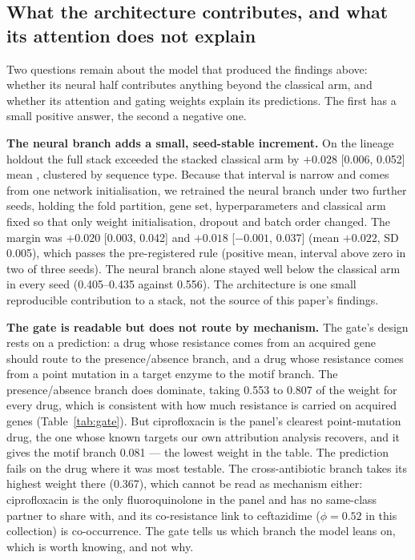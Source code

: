 \subsection*{What the architecture contributes, and what its attention does not explain}

Two questions remain about the model that produced the findings above: whether its neural half
contributes anything beyond the classical arm, and whether its attention and gating weights explain
its predictions. The first has a small positive answer, the second a negative one.

\textbf{The neural branch adds a small, seed-stable increment.} On the lineage holdout the full
stack exceeded the stacked classical arm by $+0.028$ [0.006, 0.052] mean \nap{}, clustered by
sequence type. Because that interval is narrow and comes from one network initialisation, we
retrained the neural branch under two further seeds, holding the fold partition, gene set,
hyperparameters and classical arm fixed so that only weight initialisation, dropout and batch order
changed. The margin was $+0.020$ [0.003, 0.042] and $+0.018$ [$-0.001$, 0.037] (mean $+0.022$, SD
0.005), which passes the pre-registered rule (positive mean, interval above zero in two of three
seeds). The neural branch alone stayed well below the classical arm in every seed (0.405--0.435
against 0.556). The architecture is one small reproducible contribution to a stack, not the source
of this paper's findings.

\textbf{The gate is readable but does not route by mechanism.} The gate's design rests on a
prediction: a drug whose resistance comes from an acquired gene should route to the
presence/absence branch, and a drug whose resistance comes from a point mutation in a target enzyme
to the motif branch. The presence/absence branch does dominate, taking 0.553 to 0.807 of the weight
for every drug, which is consistent with how much \Ecoli{} resistance is carried on acquired genes
(Table~\ref{tab:gate}). But ciprofloxacin is the panel's clearest point-mutation drug, the one
whose known targets our own attribution analysis recovers, and it gives the motif branch 0.081 ---
the lowest weight in the table. The prediction fails on the drug where it was most testable. The
cross-antibiotic branch takes its highest weight there (0.367), which cannot be read as mechanism
either: ciprofloxacin is the only fluoroquinolone in the panel and has no same-class partner to
share with, and its co-resistance link to ceftazidime ($\phi = 0.52$ in this collection) is
co-occurrence. The gate tells us which branch the model leans on, which is worth knowing, and not
why.

